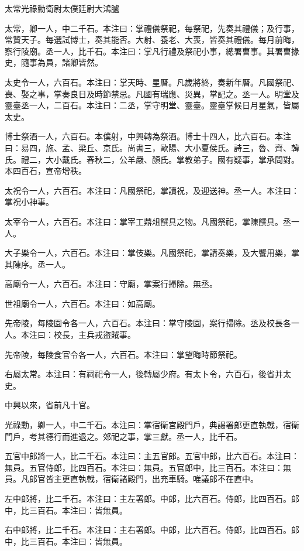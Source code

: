 
\begin{pinyinscope}
太常光祿勳衛尉太僕廷尉大鴻臚

太常，卿一人，中二千石。本注曰：掌禮儀祭祀，每祭祀，先奏其禮儀；及行事，常贊天子。每選試博士，奏其能否。大射、養老、大喪，皆奏其禮儀。每月前晦，察行陵廟。丞一人，比千石。本注曰：掌凡行禮及祭祀小事，總署曹事。其署曹掾史，隨事為員，諸卿皆然。

太史令一人，六百石。本注曰：掌天時、星曆。凡歲將終，奏新年曆。凡國祭祀、喪、娶之事，掌奏良日及時節禁忌。凡國有瑞應、災異，掌記之。丞一人。明堂及靈臺丞一人，二百石。本注曰：二丞，掌守明堂、靈臺。靈臺掌候日月星氣，皆屬太史。

博士祭酒一人，六百石。本僕射，中興轉為祭酒。博士十四人，比六百石。本注曰：易四，施、孟、梁丘、京氏。尚書三，歐陽、大小夏侯氏。詩三，魯、齊、韓氏。禮二，大小戴氏。春秋二，公羊嚴、顏氏。掌教弟子。國有疑事，掌承問對。本四百石，宣帝增秩。

太祝令一人，六百石。本注曰：凡國祭祀，掌讀祝，及迎送神。丞一人。本注曰：掌祝小神事。

太宰令一人，六百石。本注曰：掌宰工鼎俎饌具之物。凡國祭祀，掌陳饌具。丞一人。

大子樂令一人，六百石。本注曰：掌伎樂。凡國祭祀，掌請奏樂，及大饗用樂，掌其陳序。丞一人。

高廟令一人，六百石。本注曰：守廟，掌案行掃除。無丞。

世祖廟令一人，六百石。本注曰：如高廟。

先帝陵，每陵園令各一人，六百石。本注曰：掌守陵園，案行掃除。丞及校長各一人。本注曰：校長，主兵戎盜賊事。

先帝陵，每陵食官令各一人，六百石。本注曰：掌望晦時節祭祀。

右屬太常。本注曰：有祠祀令一人，後轉屬少府。有太卜令，六百石，後省并太史。

中興以來，省前凡十官。

光祿勳，卿一人，中二千石。本注曰：掌宿衛宮殿門戶，典謁署郎更直執戟，宿衛門戶，考其德行而進退之。郊祀之事，掌三獻。丞一人，比千石。

五官中郎將一人，比二千石。本注曰：主五官郎。五官中郎，比六百石。本注曰：無員。五官侍郎，比四百石。本注曰：無員。五官郎中，比三百石。本注曰：無員。凡郎官皆主更直執戟，宿衛諸殿門，出充車騎。唯議郎不在直中。

左中郎將，比二千石。本注曰：主左署郎。中郎，比六百石。侍郎，比四百石。郎中，比三百石。本注曰：皆無員。

右中郎將，比二千石。本注曰：主右署郎。中郎，比六百石。侍郎，比四百石。郎中，比三百石。本注曰：皆無員。


\end{pinyinscope}
